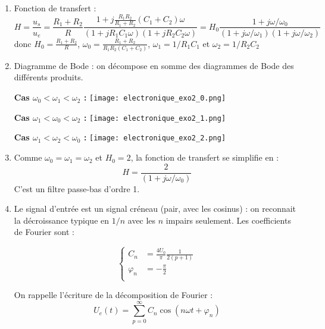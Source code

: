 \begin{correction}

\begin{enumerate}

	\item Fonction de transfert :
\begin{equation}
	H=\frac{u_s}{u_e}=\frac{R_1+R_2}{R}\frac{1+j\frac{R_1R_2}{R_1+R_2}(C_1+C_2)\omega}{(1+jR_1C_1\omega)(1+jR_2C_2\omega)}=H_0\frac{1+j\omega/\omega_0}{(1+j\omega/\omega_1)(1+j\omega/\omega_2)}
\end{equation}
donc $H_0=\frac{R_1+R_2}{R}$, $\omega_0=\frac{R_1+R_2}{R_1R_2(C_1+C_2)}$, $\omega_1=1/R_1C_1$ et $\omega_2=1/R_2C_2$

	\item Diagramme de Bode : on décompose en somme des diagrammes de Bode des différents produits.

\textbf{Cas $\omega_0<\omega_1<\omega_2$ :}
\centering
\texttt{[image: electronique\_exo2\_0.png]}

\textbf{Cas $\omega_1<\omega_0<\omega_2$ :}
	\centering
	\texttt{[image: electronique\_exo2\_1.png]}

\textbf{Cas $\omega_1<\omega_2<\omega_0$ :}
	\centering
	\texttt{[image: electronique\_exo2\_2.png]}

	\item Comme $\omega_0=\omega_1=\omega_2$ et $H_0=2$, la fonction de transfert se simplifie en : 
\begin{equation}
	H=\frac{2}{(1+j\omega/\omega_0)}
\end{equation}	
C'est un filtre passe-bas d'ordre 1.

\item Le signal d'entrée est un signal créneau (pair, avec les cosinus) : on reconnait la décroissance typique en $1/n$ avec les $n$ impairs seulement. Les coefficients de Fourier sont :

\begin{equation}
	\left\lbrace
	\begin{array}{lll}
		C_n &= \frac{4U_0}{\pi}\frac{1}{2(p+1)}\\
		\varphi_n &= -\frac{\pi}{2} \\
	\end{array}\right.
\end{equation}

On rappelle l'écriture de la décomposition de Fourier :
\begin{equation}
	U_e(t) = \sum_{p=0}^{\infty}C_n\cos(n\omega t+\varphi_n)
\end{equation}


\end{enumerate}
\end{correction}
